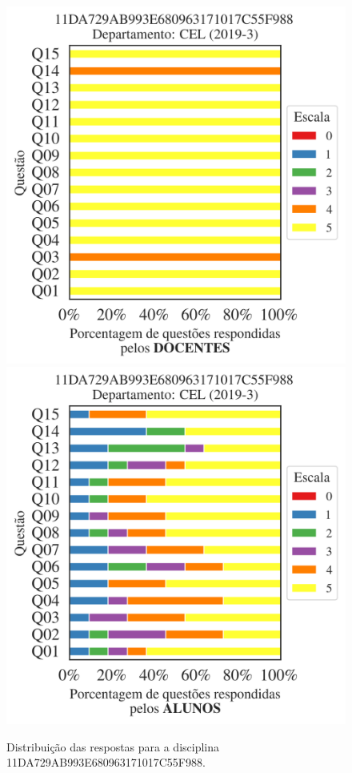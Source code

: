 \documentclass[a4paper,10pt]{article}
\begin{document}
\begin{figure}[h]
\centering
\includegraphics[width=0.485\linewidth]{analise_disciplina_departamento_CEL_11DA729AB993E680963171017C55F988_docentes.png}
\includegraphics[width=0.485\linewidth]{analise_disciplina_departamento_CEL_11DA729AB993E680963171017C55F988_alunos.png}
\caption{\label{fig:analise_geral_departamento}                Distribuição das respostas para a disciplina 11DA729AB993E680963171017C55F988. }
\end{figure}
\end{document}
